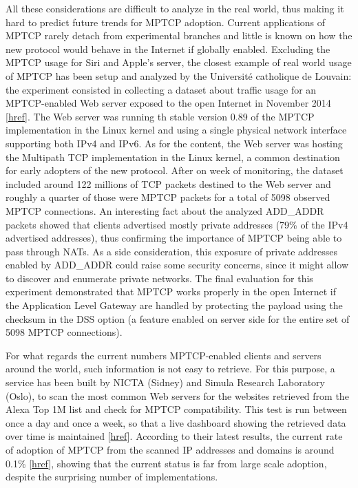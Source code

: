 All these considerations are difficult to analyze in the real world, thus making it hard to predict future trends for MPTCP adoption. Current applications of MPTCP rarely detach from experimental branches and little is known on how the new protocol would behave in the Internet if globally enabled. Excluding the MPTCP usage for Siri and Apple's server, the closest example of real world usage of MPTCP has been setup and analyzed by the Université catholique de Louvain: the experiment consisted in collecting a dataset about traffic usage for an MPTCP-enabled Web server exposed to the open Internet in November 2014 [\href{http://inl.info.ucl.ac.be/system/files/paper_8.pdf}{href}]. The Web server was running th stable version 0.89 of the MPTCP implementation in the Linux kernel and using a single physical network interface supporting both IPv4 and IPv6. As for the content, the Web server was hosting the Multipath TCP implementation in the Linux kernel, a common destination for early adopters of the new protocol. After on week of monitoring, the dataset included around 122 millions of TCP packets destined to the Web server and roughly a quarter of those were MPTCP packets for a total of 5098 observed MPTCP connections. 
An interesting fact about the analyzed ADD\_ADDR packets showed that clients advertised mostly private addresses (79\% of the IPv4 advertised addresses), thus confirming the importance of MPTCP being able to pass through NATs. As a side consideration, this exposure of private addresses enabled by ADD\_ADDR could raise some security concerns, since it might allow to discover and enumerate private networks. 
The final evaluation for this experiment demonstrated that MPTCP works properly in the open Internet if the Application Level Gateway are handled by protecting the payload using the checksum in the DSS option (a feature enabled on server side for the entire set of 5098 MPTCP connections).


For what regards the current numbers MPTCP-enabled clients and servers around the world, such information is not easy to retrieve. For this purpose, a service has been built by NICTA (Sidney) and Simula Research Laboratory (Oslo), to scan the most common Web servers for the websites retrieved from the Alexa Top 1M list and check for MPTCP compatibility. This test is run between once a day and once a week, so that a live dashboard showing the retrieved data over time is maintained [\href{https://academic-network-security.research.nicta.com.au/mptcp/deployment/}{href}]. According to their latest results, the current rate of adoption of MPTCP from the scanned IP addresses and domains is around 0.1\% [\href{http://www.nicta.com.au/publications/research-publications/?pid=8791}{href}], showing that the current status is far from large scale adoption, despite the surprising number of implementations.

